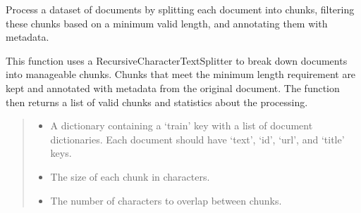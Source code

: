 \documentclass[letterpaper,10pt,english,openany,oneside]{sphinxmanual}
\begin{document}

\begin{fulllineitems}
\label{\detokenize{data_preparation:tools.pipeline.process_documents}}
\pysigstartsignatures
{}
\pysigstopsignatures
\sphinxAtStartPar
Process a dataset of documents by splitting each document into chunks, filtering these chunks based
on a minimum valid length, and annotating them with metadata.

\sphinxAtStartPar
This function uses a RecursiveCharacterTextSplitter to break down documents into manageable chunks. 
Chunks that meet the minimum length requirement are kept and annotated with metadata from the original
document. The function then returns a list of valid chunks and statistics about the processing.
\begin{quote}\begin{description}
\begin{itemize}
\item {} 
\sphinxAtStartPar
{} \textendash{} A dictionary containing a ‘train’ key with a list of document dictionaries. Each document
should have ‘text’, ‘id’, ‘url’, and ‘title’ keys.

\item {} 
\sphinxAtStartPar
{} \textendash{} The size of each chunk in characters.

\item {} 
\sphinxAtStartPar
{} \textendash{} The number of characters to overlap between chunks.


\end{itemize}
\end{description}
\end{quote}
\end{fulllineitems}
\end{document}

